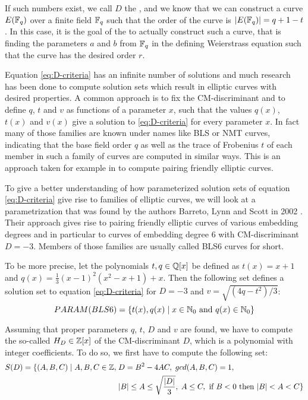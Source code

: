If such numbers exist, we call $D$ the , and we know that we can construct a curve $E(\mathbb{F}_q)$ over a finite field $\mathbb{F}_q$ such that the order of the curve is $|E(\mathbb{F}_q)|= q+1-t$. In this case, it is the goal of the  to actually construct such a curve, that is finding the parameters $a$ and $b$ from $\mathbb{F}_q$ in the defining Weierstrass equation such that the curve has the desired order $r$. 

Equation \ref{eq:D-criteria} has an infinite number of solutions and much research has been done to compute solution sets which result in elliptic curves with desired properties. A common approach is to fix the CM-discriminant and to define $q$, $t$ and $v$ as functions of a parameter $x$, such that the values $q(x)$, $t(x)$ and $v(x)$ give a solution to \ref{eq:D-criteria} for every parameter $x$. In fact many of those families are known under names like BLS \cite{bls-02} or NMT \cite{mnt-84} curves, indicating that the base field order $q$ as well as the trace of Frobenius $t$ of each member in such a family of curves are computed in similar ways. This is an approach taken for example in \cite{freeman-06} to compute pairing friendly elliptic curves.
\begin{example}
\label{ex:bls6-params} To give a better understanding of how parameterized solution sets of equation \ref{eq:D-criteria} give rise to families of elliptic curves, we will look at a parametrization that was found by the authors Barreto, Lynn and Scott in 2002 \cite{bls-02}. Their approach gives rise to pairing friendly elliptic curves of various embedding degrees and in particular to curves of embedding degree $6$ with CM-discriminant $D=-3$. Members of those families are usually called BLS6 curves for short. 

To be more precise, let the polynomials $t,q\in \mathbb{Q}[x]$ be defined as $t(x)=x+1$ and $q(x) = \frac{1}{3}(x-1)^2(x^2-x+1) + x$. Then the following set defines a solution set to equation \ref{eq:D-criteria} for $D=-3$ and $v= \sqrt{(4 q - t^2)/3}$: 
\begin{equation}
PARAM(BLS6) = \{t(x), q(x) \;|\; x\in \mathbb{N}_0 \text{ and } q(x)\in\mathbb{N}_0\}
\end{equation}  
\end{example}

Assuming that proper parameters $q$, $t$, $D$ and $v$ are found, we have to compute the so-called  $H_D\in \mathbb{Z}[x]$ of the CM-discriminant $D$, which is a polynomial with integer coefficients. To do so, we first have to compute the following set:
\begin{equation}
\begin{aligned}
\label{def:hilbert_class_domain}
S(D)=\{(A,B,C)\;|\; A,B,C\in\mathbb{Z},\; &D = B^2-4AC,\; gcd(A,B,C)=1, \\
&|B|\leq A \leq \sqrt{\frac{|D|}{3}},\; A\leq C, 
\text{ if } B< 0 \text{ then } |B| < A < C\}
\end{aligned}
\end{equation}


